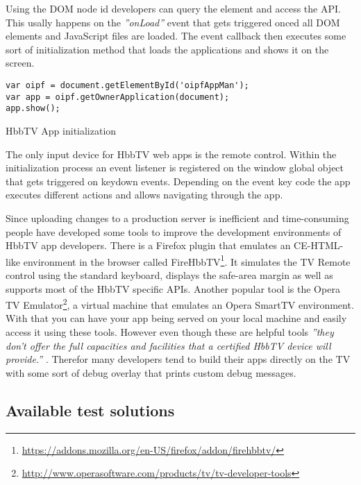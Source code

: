 Using the DOM node id developers can query the element and access the API. This usally happens on the \textit{''onLoad''} event that gets triggered onced all DOM elements and JavaScript files are loaded. The event callback then executes some sort of initialization method that loads the applications and shows it on the screen.

\vspace{0.5cm}
\begin{listing}[H]
\begin{verbatim}
var oipf = document.getElementById('oipfAppMan');
var app = oipf.getOwnerApplication(document);
app.show();
\end{verbatim}
\caption{HbbTV App initialization}
\label{lst:loadApp}
\end{listing}

The only input device for HbbTV web apps is the remote control. Within the initialization process an event listener is registered on the window global object that gets triggered on keydown events. Depending on the event key code the app executes different actions and allows navigating through the app.

Since uploading changes to a production server is inefficient and time-consuming people have developed some tools to improve the development environments of HbbTV app developers. There is a Firefox plugin that emulates an CE-HTML-like environment in the browser called FireHbbTV\footnote{\url{https://addons.mozilla.org/en-US/firefox/addon/firehbbtv/}}. It simulates the TV Remote control using the standard keyboard, displays the safe-area margin as well as supports most of the HbbTV specific APIs. Another popular tool is the Opera TV Emulator\footnote{\url{http://www.operasoftware.com/products/tv/tv-developer-tools}}, a virtual machine that emulates an Opera SmartTV environment. With that you can have your app being served on your local machine and easily access it using these tools. However even though these are helpful tools \textit{''they don't offer the full capacities and facilities that a certified HbbTV device will provide.''} \cite{hbbtvenv}. Therefor many developers tend to build their apps directly on the TV with some sort of debug overlay that prints custom debug messages.

\subsection{Available test solutions\label{sec:availabletestsolutions}}

